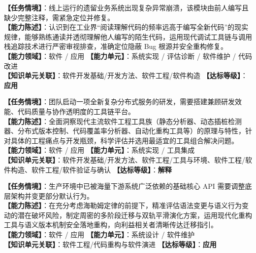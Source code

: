 \begin{taskbox}[任务 4：遗留与第三方代码库的缺陷排查与调试修复]
\textbf{【任务情境】}：线上运行的遗留业务系统出现复杂异常崩溃，该模块由前人编写且缺少完整注释，需紧急定位并修复。\\
\textbf{【能力陈述】}：认识到在工业界“阅读理解代码的频率远高于编写全新代码”的现实规律，能够熟练通读并透彻理解他人编写的陌生代码，运用现代调试工具链与调用栈追踪技术进行严密审视排查，准确定位隐蔽 Bug 根源并安全重构修复。\\
\textbf{【能力领域】}：软件 / 应用 \quad \textbf{【能力单元】}：系统实现 / 评估诊断 / 软件维护 / 代码改进\\
\textbf{【知识单元关联】}：软件开发基础/开发方法、软件工程/软件构造 \quad \textbf{【达标等级】}：\textbf{应用}
\end{taskbox}

\begin{taskbox}
\textbf{【任务情境】}：团队启动一项全新复杂分布式服务的研发，需要搭建兼顾研发效能、代码质量与协作透明度的工具链平台。\\
\textbf{【能力陈述】}：全面洞察现代主流软件工程工具族（静态分析器、动态插桩检测器、分布式版本控制、代码覆盖率分析器、自动化重构工具等）的原理与特性，针对具体的工程痛点与开发瓶颈，科学评估并选用最适宜的工具组合解决问题。\\
\textbf{【能力领域】}：软件 / 应用 \quad \textbf{【能力单元】}：系统实现 / 工具集成\\
\textbf{【知识单元关联】}：软件开发基础/开发方法、软件工程/工具与环境、软件工程/软件构造、软件工程/软件验证与确认 \quad \textbf{【达标等级】}：\textbf{解释}
\end{taskbox}

\begin{taskbox}
\textbf{【任务情境】}：生产环境中已被海量下游系统广泛依赖的基础核心 API 需要调整底层架构并变更部分默认行为。\\
\textbf{【能力陈述】}：在充分考虑海勒姆定律的前提下，精准评估语法变更与语义行为变动的潜在破坏风险，制定周密的多阶段迁移与双轨平滑演化方案，运用现代化重构工具与语义版本机制安全落地重构，向利益相关者清晰传达迁移指引。\\
\textbf{【能力领域】}：软件 / 应用 \quad \textbf{【能力单元】}：系统设计 / 软件维护\\
\textbf{【知识单元关联】}：软件工程/代码重构与软件演进 \quad \textbf{【达标等级】}：\textbf{应用}
\end{taskbox}

